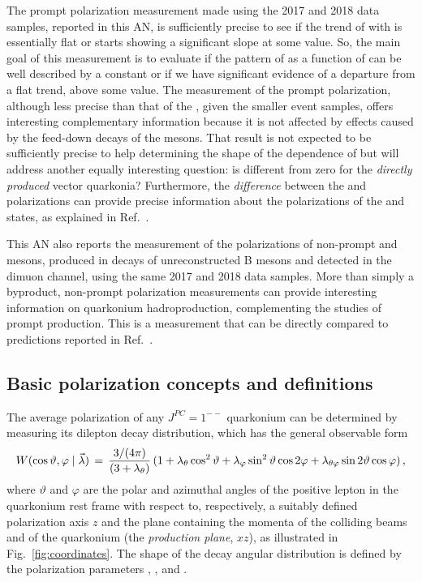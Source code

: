 The prompt \jpsi polarization measurement made using the 2017 and 2018 data samples,
reported in this AN,
is sufficiently precise to see if the trend of \lth with \pt is essentially flat or 
starts showing a significant slope at some \pt value. 
So, the main goal of this measurement is to evaluate if the pattern of \lth as a function of \pt 
can be well described by a constant
or if we have significant evidence of a departure from a flat trend, above some \pt value.
The measurement of the prompt \psip polarization, 
although less precise than that of the \jpsi, given the smaller event samples,
offers interesting complementary information because it is not affected 
by effects caused by the feed-down decays of the \chic mesons.
That result is not expected to be sufficiently precise to help determining the shape of the \pt 
dependence of \lth but will address another equally interesting question: 
is \lth different from zero for the \emph{directly produced} vector quarkonia?
Furthermore, the \emph{difference} between the \psip and \jpsi polarizations can provide
precise information about the polarizations of the \chicOne and \chicTwo states,
as explained in Ref.~\cite{bib:FLM}.

This AN also reports the measurement of the polarizations of non-prompt \jpsi and \psip mesons, 
produced in decays of unreconstructed B mesons and detected in the dimuon channel,
using the same 2017 and 2018 data samples.
More than simply a byproduct, 
non-prompt \jpsi polarization measurements can provide interesting information 
on quarkonium hadroproduction, complementing the studies of prompt production.
This is a measurement that can be directly compared to predictions reported in 
Ref.~\cite{Faccioli:2022}.

\subsection{Basic polarization concepts and definitions}
\label{sec:defs}

The average polarization of any $J^{PC}=1^{--}$ quarkonium can be determined 
by measuring its dilepton decay distribution, which has the general observable 
form~\cite{bib:Faccioli-PRL-FrameInv,bib:Faccioli-PRD-FrameInv}
%
\begin{equation}
W( \cos \vartheta, \varphi \; | \; \vec{\lambda} ) \,
 = \, \frac{3 / (4 \pi)}{(3 + \lambda_\theta)} \,
 (1 + \lambda_\theta \cos^2 \vartheta
 + \lambda_\varphi \sin^2 \vartheta \cos 2 \varphi
 + \lambda_{\theta\varphi} \sin 2 \vartheta \cos \varphi ) \, ,
\label{eq:ang_distr_general}
\end{equation}
%
where $\vartheta$ and $\varphi$ are the polar and azimuthal angles of the
positive lepton in the quarkonium rest frame with respect to, respectively, 
a suitably defined polarization axis $z$ and the
plane containing the momenta of the colliding beams and of the quarkonium
(the \emph{production plane}, $xz$), as illustrated in Fig.~\ref{fig:coordinates}. 
The shape of the decay angular distribution is defined by 
the polarization parameters \lth, \lph, and \ltp.

